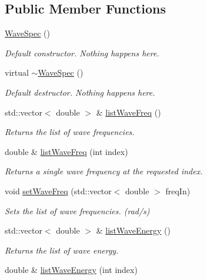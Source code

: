 \subsection*{Public Member Functions}
\begin{DoxyCompactItemize}
\item 
\hyperlink{classosea_1_1_wave_spec_a7f9958350d3773ecd4838c0f83aab69d}{Wave\-Spec} ()
\begin{DoxyCompactList}\small\item\em Default constructor. Nothing happens here. \end{DoxyCompactList}\item 
virtual \hyperlink{classosea_1_1_wave_spec_aaa9c70d5cb4a507e549f4932d9d8f360}{$\sim$\-Wave\-Spec} ()
\begin{DoxyCompactList}\small\item\em Default destructor. Nothing happens here. \end{DoxyCompactList}\item 
std\-::vector$<$ double $>$ \& \hyperlink{classosea_1_1_wave_spec_a8123faa0a659c171b1937def14565eb6}{list\-Wave\-Freq} ()
\begin{DoxyCompactList}\small\item\em Returns the list of wave frequencies. \end{DoxyCompactList}\item 
double \& \hyperlink{classosea_1_1_wave_spec_a0f627b180f8c8ab1b2d76bbcf7e4a02a}{list\-Wave\-Freq} (int index)
\begin{DoxyCompactList}\small\item\em Returns a single wave frequency at the requested index. \end{DoxyCompactList}\item 
void \hyperlink{classosea_1_1_wave_spec_a6ea11c5e3af85e0f9a9101a498a35ddd}{set\-Wave\-Freq} (std\-::vector$<$ double $>$ freq\-In)
\begin{DoxyCompactList}\small\item\em Sets the list of wave frequencies. (rad/s) \end{DoxyCompactList}\item 
std\-::vector$<$ double $>$ \& \hyperlink{classosea_1_1_wave_spec_a7ea9137186ee791072384642db81916a}{list\-Wave\-Energy} ()
\begin{DoxyCompactList}\small\item\em Returns the list of wave energy. \end{DoxyCompactList}\item 
double \& \hyperlink{classosea_1_1_wave_spec_af18c2204cdcd74856f686fda8c6f2b3f}{list\-Wave\-Energy} (int index)

\end{DoxyCompactItemize}
